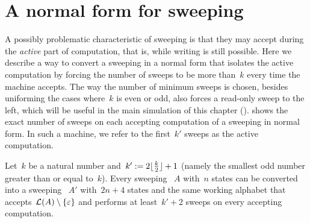 \section{A normal form for sweeping \texorpdfstring{\kDLAs}{k-DLAs}}\label{sec:equiv-swep-dla}
A possibly problematic characteristic of sweeping \kDLAs is that they may accept during the \emph{active} part of computation, that is, while writing is still possible.
Here we describe a way to convert a sweeping \kDLA in a normal form that isolates the active computation by forcing the number of sweeps to be more than~$k$ every time the machine accepts.
The way the number of minimum sweeps is chosen, besides uniforming the cases where~$k$ is even or odd, also forces a read-only sweep to the left, which will be useful in the main simulation of this chapter ().
 shows the exact number of sweeps on each accepting computation of a sweeping \kDLA in normal form.
In such a machine, we refer to the first~$k'$ sweeps as the active computation.
\begin{thrm}\label{thm:equiv-swep-dla}
	Let~$k$ be a natural number and~$k':=2\lfloor \frac{k}{2} \rfloor+1$ (namely the smallest odd number greater than or equal to~$k$).
	Every sweeping \kDLA~$A$ with~$n$ states can be converted into a sweeping \kDLA~$A'$ with~$2n+4$ states and the same working alphabet that accepts~$\mathcal L(A)\setminus\{\varepsilon\}$ and performs at least~$k'+2$ sweeps on every accepting computation.
\end{thrm}
